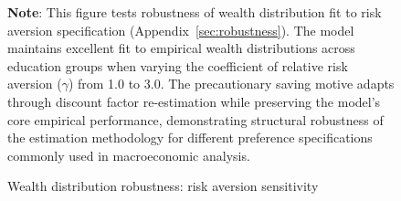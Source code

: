 \documentclass[\latexroot/\projectname]{subfiles}
\begin{document}
\begin{figure}[htb] %
  \centering
  \caption{\pregenmark Wealth distribution robustness: risk aversion sensitivity}
  \whenintegrated{\label{fig:LorenzPts_robustness_CRRA}} %

  \medskip
  \noindent\parbox{\textwidth}{\footnotesize
    \textbf{Note}: This figure tests robustness of wealth distribution fit to risk aversion specification
    (Appendix~\ref{sec:robustness}).
    The model maintains excellent fit to empirical wealth distributions across education groups
    when varying the coefficient of relative risk aversion ($\gamma$) from 1.0 to 3.0.
    The precautionary saving motive adapts through discount factor re-estimation while preserving
    the model's core empirical performance, demonstrating structural robustness of the estimation
    methodology for different preference specifications commonly used in macroeconomic analysis.
  }
\end{figure}

\vspace{0.5em}

\smartbib
\end{document}
